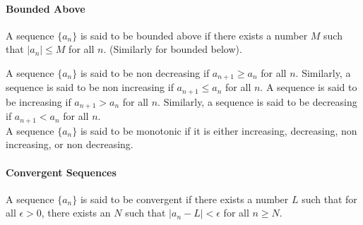 \documentclass[11pt]{article}
\begin{document}
\paragraph{Bounded Above} A sequence $\{a_n\}$ is said to be bounded above if there exists a number $M$ such that $|a_n| \le M$ for all $n$. (Similarly for bounded below).
\begin{definition}
    A sequence $\{a_n\}$ is said to be non decreasing if $a_{n+1} \ge a_n$ for all $n$. Similarly, a sequence is said to be non increasing if $a_{n+1} \le a_n$ for all $n$. A sequence is said to be increasing if $a_{n+1} > a_n$ for all $n$. Similarly, a sequence is said to be decreasing if $a_{n+1} < a_n$ for all $n$.
\\ A sequence $\{a_n\}$ is said to be monotonic if it is either increasing, decreasing, non increasing, or non decreasing.
\end{definition}
\paragraph{Convergent Sequences} A sequence $\{a_n\}$ is said to be convergent if there exists a number $L$ such that for all $\epsilon > 0$, there exists an $N$ such that $|a_n - L| < \epsilon$ for all $n \ge N$.
\appendix

\end{document}
